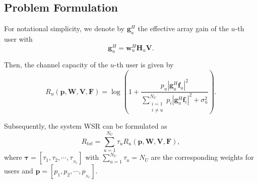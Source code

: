 \documentclass[10pt,journal,twocolumn,twoside]{IEEEtran}
\begin{document}


\subsection{Problem Formulation}
For notational simplicity, we denote by ${\bm{g}}_{u}^H$ the effective array gain of the $u$-th user with
\begin{equation}\label{eq:defgu}
{\bm{g}}_{u}^H = \bm{w}^H_u \bm{H}_u \bm{V}.
\end{equation}

Then, the channel capacity of the $u$-th user is given by
\begin{equation}\label{eq:6}
R_u(\bm{p},\bm{W},\bm{V}, \bm{F}) = \log\left(1+\frac{p_u|{\bm{g}}_{u}^H \bm{f}_u|^2}{\sum_{\substack{i=1 \\ i\neq u}}^{N_U}p_i|{\bm{g}}_{u}^H\bm{f}_i|^2+\sigma_u^2}\right).
\end{equation}

Subsequently, the system WSR can be formulated as
\begin{equation}
R_{tot}=\sum_{u=1}^{N_U} \tau_uR_u(\bm{p},\bm{W},\bm{V}, \bm{F}),
\end{equation}
where $\bm{\tau} = \left[\tau_1, \tau_2, \cdots, \tau_{_{N_U}}\right]$ with $\sum^{N_U}_{u = 1} \tau_u= N_U$ are the corresponding weights for users and $\bm{p} = [p_1, p_2, \cdots, p_{_{N_U}}]$.
\end{document}
